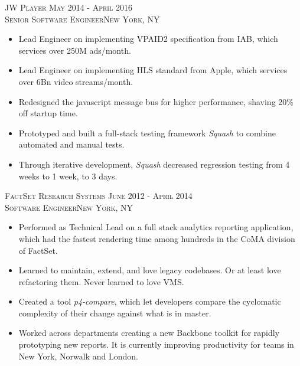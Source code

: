 \documentclass[oneside, final]{scrartcl}
\begin{document}
\begin{center}
\textsc{JW Player \hfill May 2014 - April 2016\\}
\textsc{Senior Software Engineer\hfill New York, NY\\}
\begin{itemize}
    \vspace{-4pt}
	\setlength{\itemsep}{1pt}
	\setlength{\itemsep}{1pt}
	\setlength{\parskip}{0pt}
	\setlength{\parsep}{0pt}
	\setlength{\leftmargin}{-5mm}
	\item Lead Engineer on implementing VPAID2 specification from IAB, which services over 250M ads/month.
	\item Lead Engineer on implementing HLS standard from Apple, which services over 6Bn video streams/month.
	\item Redesigned the javascript message bus for higher performance, shaving 20\% off startup time.
	\item Prototyped and built a full-stack testing framework \textit{Squash} to combine automated and manual tests.
	\item Through iterative development, \textit{Squash} decreased regression testing from 4 weeks to 1 week, to 3 days.
\end{itemize}

\textsc{FactSet Research Systems \hfill June 2012 - April 2014\\}
\textsc{Software Engineer\hfill New York, NY\\}
\begin{itemize}
    \vspace{-4pt}
	\setlength{\itemsep}{1pt}
	\setlength{\parskip}{0pt}
	\setlength{\parsep}{0pt}
	\setlength{\leftmargin}{-5mm}
	\item Performed as Technical Lead on a full stack analytics reporting application, which had the fastest rendering time among hundreds in the CoMA division of FactSet.
	\item Learned to maintain, extend, and love legacy codebases. Or at least love refactoring them. Never learned to love VMS.
	\item Created a tool \textit{p4-compare}, which let developers compare the cyclomatic complexity of their change against what is in master.
	\item Worked across departments creating a new Backbone toolkit for rapidly prototyping new reports. It is currently improving productivity for teams in New York, Norwalk and London.
\end{itemize}





\end{center}
\end{document}
